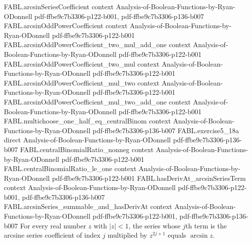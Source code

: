 \begin{lemma}
\label{FABL.arcsinSeries_eq_arcsin_of_abs_lt_one}
\leanok
{}
\proofstep
  {FABL.arcsinSeriesCoefficient}
  {context}
  {Analysis-of-Boolean-Functions-by-Ryan-ODonnell}
  {pdf-ffbe9c7b3306-p122-b001,
    pdf-ffbe9c7b3306-p136-b007}
\proofstep
  {FABL.arcsinOddPowerCoefficient}
  {context}
  {Analysis-of-Boolean-Functions-by-Ryan-ODonnell}
  {pdf-ffbe9c7b3306-p122-b001}
\proofstep
  {FABL.arcsinOddPowerCoefficient_two_mul_add_one}
  {context}
  {Analysis-of-Boolean-Functions-by-Ryan-ODonnell}
  {pdf-ffbe9c7b3306-p122-b001}
\proofstep
  {FABL.arcsinOddPowerCoefficient_two_mul}
  {context}
  {Analysis-of-Boolean-Functions-by-Ryan-ODonnell}
  {pdf-ffbe9c7b3306-p122-b001}
\proofstep
  {FABL.arcsinOddPowerCoefficient_mul_two}
  {context}
  {Analysis-of-Boolean-Functions-by-Ryan-ODonnell}
  {pdf-ffbe9c7b3306-p122-b001}
\proofstep
  {FABL.arcsinOddPowerCoefficient_mul_two_add_one}
  {context}
  {Analysis-of-Boolean-Functions-by-Ryan-ODonnell}
  {pdf-ffbe9c7b3306-p122-b001}
\proofstep
  {FABL.multichoose_one_half_eq_centralBinom}
  {context}
  {Analysis-of-Boolean-Functions-by-Ryan-ODonnell}
  {pdf-ffbe9c7b3306-p136-b007}
\proofstep
  {FABL.exercise5_18a}
  {direct}
  {Analysis-of-Boolean-Functions-by-Ryan-ODonnell}
  {pdf-ffbe9c7b3306-p136-b007}
\proofstep
  {FABL.centralBinomialRatio_nonneg}
  {context}
  {Analysis-of-Boolean-Functions-by-Ryan-ODonnell}
  {pdf-ffbe9c7b3306-p122-b001}
\proofstep
  {FABL.centralBinomialRatio_le_one}
  {context}
  {Analysis-of-Boolean-Functions-by-Ryan-ODonnell}
  {pdf-ffbe9c7b3306-p122-b001}
\proofstep
  {FABL.hasDerivAt_arcsinSeriesTerm}
  {context}
  {Analysis-of-Boolean-Functions-by-Ryan-ODonnell}
  {pdf-ffbe9c7b3306-p122-b001,
    pdf-ffbe9c7b3306-p136-b007}
\proofstep
  {FABL.arcsinSeries_summable_and_hasDerivAt}
  {context}
  {Analysis-of-Boolean-Functions-by-Ryan-ODonnell}
  {pdf-ffbe9c7b3306-p122-b001,
    pdf-ffbe9c7b3306-p136-b007}
For every real number $z$ with $|z|<1$, the series whose $j$th term is the arcsine
series coefficient of index $j$ multiplied by $z^{2j+1}$ equals $\arcsin z$.
\end{lemma}

